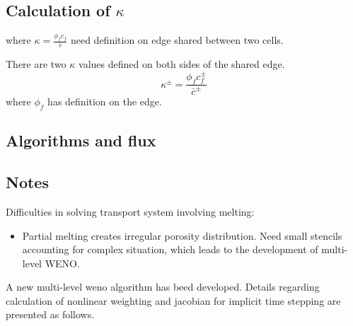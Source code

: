 \subsection{Calculation of $\kappa$}
where $\kappa = \frac{\phi_f c_f}{\bar{c}}$ need definition on edge shared between two cells.
\begin{center}
\end{center}
There are two $\kappa$ values defined on both sides of the shared edge.
\begin{equation*}
		  \kappa^{\pm} = \frac{\phi_f c^{\pm}_f}{\bar{c}^{\pm}}
\end{equation*}
where $\phi_f$ has definition on the edge.

\subsection{Algorithms and flux}


\subsection{Notes}
Difficulties in solving transport system involving melting:
\begin{itemize}
\item Partial melting creates irregular porosity distribution.
Need small stencils accounting for complex situation, which leads to the development of multi-level WENO.
\end{itemize}
A new multi-level weno algorithm has beed developed\cite{MultiLevelWeno}.
Details regarding calculation of nonlinear weighting and jacobian for implicit time stepping are presented as follows.
